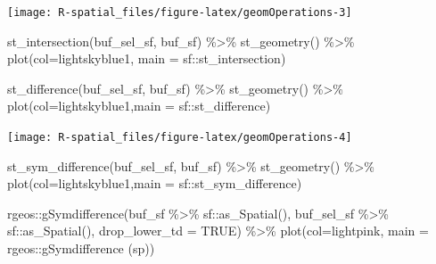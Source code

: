 \documentclass[
  11pt,
]{book}
\newenvironment{Shaded}{\begin{snugshade}}{\end{snugshade}}
\newcommand{\AttributeTok}[1]{\textcolor[rgb]{0.77,0.63,0.00}{#1}}
\newcommand{\ConstantTok}[1]{\textcolor[rgb]{0.00,0.00,0.00}{#1}}
\newcommand{\FunctionTok}[1]{\textcolor[rgb]{0.00,0.00,0.00}{#1}}
\newcommand{\NormalTok}[1]{#1}
\newcommand{\SpecialCharTok}[1]{\textcolor[rgb]{0.00,0.00,0.00}{#1}}
\newcommand{\StringTok}[1]{\textcolor[rgb]{0.31,0.60,0.02}{#1}}
\begin{document}
\texttt{[image: R-spatial\_files/figure-latex/geomOperations-3]}

\begin{Shaded}
\begin{Highlighting}[]
\FunctionTok{st\_intersection}\NormalTok{(buf\_sel\_sf, buf\_sf) }\SpecialCharTok{\%\textgreater{}\%} 
  \FunctionTok{st\_geometry}\NormalTok{() }\SpecialCharTok{\%\textgreater{}\%} 
  \FunctionTok{plot}\NormalTok{(}\AttributeTok{col=}\StringTok{\textquotesingle{}lightskyblue1\textquotesingle{}}\NormalTok{, }\AttributeTok{main =} \StringTok{\textquotesingle{}sf::st\_intersection\textquotesingle{}}\NormalTok{)}

\FunctionTok{st\_difference}\NormalTok{(buf\_sel\_sf, buf\_sf) }\SpecialCharTok{\%\textgreater{}\%} \FunctionTok{st\_geometry}\NormalTok{() }\SpecialCharTok{\%\textgreater{}\%} 
  \FunctionTok{plot}\NormalTok{(}\AttributeTok{col=}\StringTok{\textquotesingle{}lightskyblue1\textquotesingle{}}\NormalTok{,}\AttributeTok{main =} \StringTok{\textquotesingle{}sf::st\_difference\textquotesingle{}}\NormalTok{)}
\end{Highlighting}
\end{Shaded}

\texttt{[image: R-spatial\_files/figure-latex/geomOperations-4]}

\begin{Shaded}
\begin{Highlighting}[]
\FunctionTok{st\_sym\_difference}\NormalTok{(buf\_sel\_sf, buf\_sf) }\SpecialCharTok{\%\textgreater{}\%} 
  \FunctionTok{st\_geometry}\NormalTok{() }\SpecialCharTok{\%\textgreater{}\%} 
  \FunctionTok{plot}\NormalTok{(}\AttributeTok{col=}\StringTok{\textquotesingle{}lightskyblue1\textquotesingle{}}\NormalTok{,}\AttributeTok{main =} \StringTok{\textquotesingle{}sf::st\_sym\_difference\textquotesingle{}}\NormalTok{)}

\NormalTok{rgeos}\SpecialCharTok{::}\FunctionTok{gSymdifference}\NormalTok{(buf\_sf }\SpecialCharTok{\%\textgreater{}\%}\NormalTok{ sf}\SpecialCharTok{::}\FunctionTok{as\_Spatial}\NormalTok{(), }
\NormalTok{                      buf\_sel\_sf }\SpecialCharTok{\%\textgreater{}\%}\NormalTok{ sf}\SpecialCharTok{::}\FunctionTok{as\_Spatial}\NormalTok{(), }
                      \AttributeTok{drop\_lower\_td =} \ConstantTok{TRUE}\NormalTok{) }\SpecialCharTok{\%\textgreater{}\%} 
  \FunctionTok{plot}\NormalTok{(}\AttributeTok{col=}\StringTok{\textquotesingle{}lightpink\textquotesingle{}}\NormalTok{, }\AttributeTok{main =} \StringTok{\textquotesingle{}rgeos::gSymdifference (sp)\textquotesingle{}}\NormalTok{)}
\end{Highlighting}
\end{Shaded}
\end{document}
